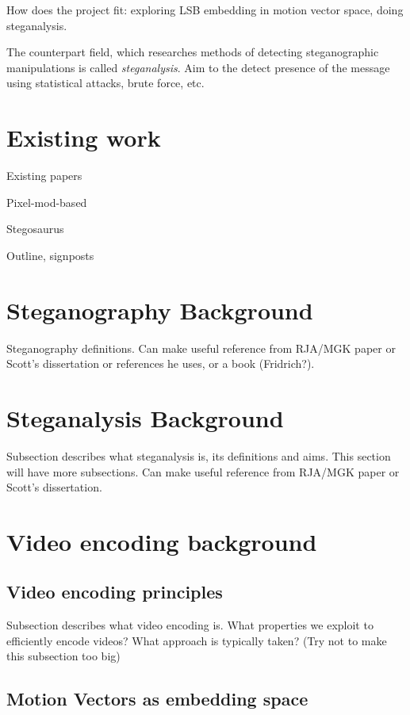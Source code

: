 \documentclass[12pt,british,twoside,notitlepage,usenames,dvipsnames,hypens,final]{report}
\numberwithin{equation}{section}
\numberwithin{figure}{section}
\begin{document}
How does the project fit: exploring LSB embedding in motion vector space, doing steganalysis.


The counterpart field, which researches methods of detecting steganographic manipulations is called \emph{steganalysis}. Aim to the detect presence of the message using statistical attacks, brute force, etc.


\section{Existing work}

Existing papers

Pixel-mod-based

Stegosaurus


Outline, signposts

\section{Steganography Background}

Steganography definitions. Can make useful reference from RJA/MGK paper or Scott's dissertation or references he uses, or a book (Fridrich?). 

\section{Steganalysis Background}

Subsection describes what steganalysis is, its definitions and aims. This section will have more subsections. Can make useful reference from RJA/MGK paper or Scott's dissertation. 

\section{Video encoding background}

\subsection{Video encoding principles}

Subsection describes what video encoding is. What properties we exploit to efficiently encode videos? What approach is typically taken? (Try not to make this subsection too big)

\subsection{Motion Vectors as embedding space}
\end{document}
